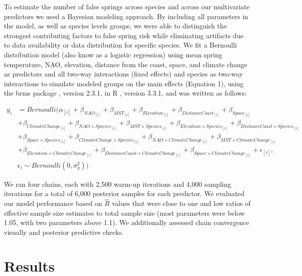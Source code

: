 \documentclass{article}\usepackage[]{graphicx}\usepackage[]{color}
\begin{document}
To estimate the number of false springs across species and across our multivariate predictors we used a Bayesian modeling approach. By including all parameters in the model, as well as species levels groups, we were able to distinguish the strongest contributing factors to false spring risk while eliminating artifacts due to data availability or data distribution for specific species. We fit a Bernoulli distribution model (also know as a logistic regression) using mean spring temperature, NAO, elevation, distance from the coast, space, and climate change as predictors and all two-way interactions (fixed effects) and species as two-way interactions to simulate modeled groups on the main effects (Equation 1), using the brms package \citep{brms}, version 2.3.1,  in R \citep{R}, version 3.3.1, and was written as follows:

\begin{align*}
y_i &= Bernoulli(\alpha_{[i]} +  \beta_{NAO_{[i]}} + \beta_{MST_{[i]}} + \beta_{Elevation_{[i]}} + \beta_{DistanceCoast_{[i]}} + \beta_{Space_{[i]}} \\ 
  &+ \beta_{ClimateChange_{[i]}} + \beta_{NAO \times Species_{[i]}} + \beta_{MST \times Species_{[i]}} + \beta_{Elevation \times Species_{[i]}} + \beta_{DistanceCoast \times Species_{[i]}}\\
  &+ \beta_{Space \times Species_{[i]}} + \beta_{ClimateChange \times Species_{[i]}} + \beta_{NAO \times ClimateChange_{[i]}} + \beta_{MST \times ClimateChange_{[i]}}\\
  &+ \beta_{Elevation \times ClimateChange_{[i]}} + \beta_{DistanceCoast \times ClimateChange_{[i]}} + \beta_{Space \times ClimateChange_{[i]}} + \epsilon_{[i]},\nonumber\\
  & \epsilon_i \sim Bernoulli(0,\sigma^2_y))\tag{1}
\end{align*}

We ran four chains, each with 2,500 warm-up iterations and 4,000 sampling iterations for a total of 6,000 posterior samples for each predictor. We evaluated our model performance based on $\hat{R}$ values that were close to one and low ratios of effective sample size estimates to total sample size (most parameters were below 1.05, with two parameters above 1.1). We additionally assessed chain convergence visually and posterior predictive checks.

\section*{Results}
\end{document}
